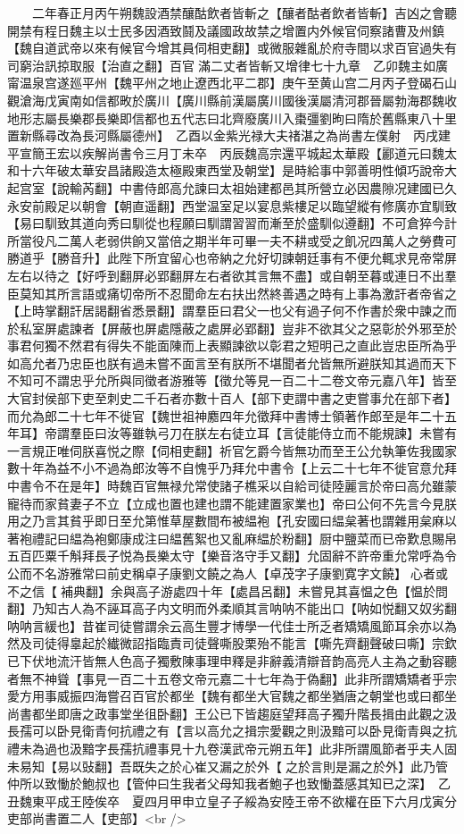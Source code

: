 　　二年春正月丙午朔魏設酒禁釀酤飲者皆斬之【釀者酤者飲者皆斬】吉凶之會聽開禁有程日魏主以士民多因酒致鬪及議國政故禁之增置内外候官伺察諸曹及州鎮【魏自道武帝以來有候官今增其員伺相吏翻】或微服雜亂於府寺間以求百官過失有司窮治訊掠取服【治直之翻】百官滿二丈者皆斬又增律七十九章　乙卯魏主如廣甯温泉宫遂廵平州【魏平州之地止遼西北平二郡】庚午至黄山宫二月丙子登碣石山觀滄海戊寅南如信都畋於廣川【廣川縣前漢屬廣川國後漢屬清河郡晉屬勃海郡魏收地形志屬長樂郡長樂即信都也五代志曰北齊廢廣川入棗彊劉昫曰隋於舊縣東八十里置新縣尋改為長河縣屬德州】　乙酉以金紫光禄大夫禇湛之為尚書左僕射　丙戌建平宣簡王宏以疾解尚書令三月丁未卒　丙辰魏高宗還平城起太華殿【酈道元曰魏太和十六年破太華安昌諸殿造太極殿東西堂及朝堂】是時給事中郭善明性傾巧說帝大起宫室【說輸芮翻】中書侍郎高允諫曰太祖始建都邑其所營立必因農隙况建國已久永安前殿足以朝會【朝直遥翻】西堂温室足以宴息紫樓足以臨望縱有修廣亦宜馴致【易曰馴致其道向秀曰馴從也程願曰馴謂習習而漸至於盛馴似遵翻】不可倉猝今計所當役凡二萬人老弱供餉又當倍之期半年可畢一夫不耕或受之飢况四萬人之勞費可勝道乎【勝音升】此陛下所宜留心也帝納之允好切諫朝廷事有不便允輒求見帝常屏左右以待之【好呼到翻屏必郢翻屏左右者欲其言無不盡】或自朝至暮或連日不出羣臣莫知其所言語或痛切帝所不忍聞命左右扶出然終善遇之時有上事為激訐者帝省之【上時掌翻訐居謁翻省悉景翻】謂羣臣曰君父一也父有過子何不作書於衆中諫之而於私室屏處諫者【屏蔽也屏處隱蔽之處屏必郢翻】豈非不欲其父之惡彰於外邪至於事君何獨不然君有得失不能面陳而上表顯諫欲以彰君之短明己之直此豈忠臣所為乎如高允者乃忠臣也朕有過未嘗不面言至有朕所不堪聞者允皆無所避朕知其過而天下不知可不謂忠乎允所與同徵者游雅等【徵允等見一百二十二卷文帝元嘉八年】皆至大官封侯部下吏至刺史二千石者亦數十百人【部下吏謂中書之吏嘗事允在部下者】而允為郎二十七年不徙官【魏世祖神䴥四年允徵拜中書博士領著作郎至是年二十五年耳】帝謂羣臣曰汝等雖執弓刀在朕左右徒立耳【言徒能侍立而不能規諫】未嘗有一言規正唯伺朕喜悦之際【伺相吏翻】祈官乞爵今皆無功而至王公允執筆佐我國家數十年為益不小不過為郎汝等不自愧乎乃拜允中書令【上云二十七年不徙官意允拜中書令不在是年】時魏百官無禄允常使諸子樵采以自給司徒陸麗言於帝曰高允雖蒙寵待而家貧妻子不立【立成也置也建也謂不能建置家業也】帝曰公何不先言今見朕用之乃言其貧乎即日至允第惟草屋數間布被緼袍【孔安國曰緼枲著也謂雜用枲麻以著袍禮記曰緼為袍鄭康成注曰緼舊絮也又亂麻緼於粉翻】厨中鹽菜而已帝歎息賜帛五百匹粟千斛拜長子悦為長樂太守【樂音洛守手又翻】允固辭不許帝重允常呼為令公而不名游雅常曰前史稱卓子康劉文饒之為人【卓茂字子康劉寛字文饒】心者或不之信【補典翻】余與高子游處四十年【處昌呂翻】未嘗見其喜愠之色【愠於問翻】乃知古人為不誣耳高子内文明而外柔順其言呐呐不能出口【呐如悦翻又奴劣翻呐呐言緩也】昔崔司徒嘗謂余云高生豐才博學一代佳士所乏者矯矯風節耳余亦以為然及司徒得辠起於纎微詔指臨責司徒聲嘶股栗殆不能言【嘶先齊翻聲破曰嘶】宗欽已下伏地流汗皆無人色高子獨敷陳事理申釋是非辭義清辯音韵高亮人主為之動容聽者無不神聳【事見一百二十五卷文帝元嘉二十七年為于偽翻】此非所謂矯矯者乎宗愛方用事威振四海嘗召百官於都坐【魏有都坐大官魏之都坐猶唐之朝堂也或曰都坐尚書都坐即唐之政事堂坐徂卧翻】王公已下皆趨庭望拜高子獨升階長揖由此觀之汲長孺可以卧見衛青何抗禮之有【言以高允之揖宗愛觀之則汲黯可以卧見衛青與之抗禮未為過也汲黯字長孺抗禮事見十九卷漢武帝元朔五年】此非所謂風節者乎夫人固未易知【易以䜴翻】吾既失之於心崔又漏之於外【之於言則是漏之於外】此乃管仲所以致慟於鮑叔也【管仲曰生我者父母知我者鮑子也致慟蓋感其知已之深】　乙丑魏東平成王陸俟卒　夏四月甲申立皇子子綏為安陸王帝不欲權在臣下六月戊寅分吏部尚書置二人【吏部】<br />
